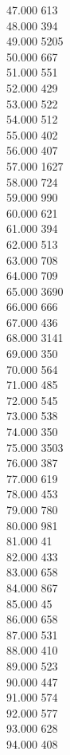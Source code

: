 { 47.000	613 \\
 48.000	394 \\
 49.000	5205 \\
 50.000	667 \\
 51.000	551 \\
 52.000	429 \\
 53.000	522 \\
 54.000	512 \\
 55.000	402 \\
 56.000	407 \\
 57.000	1627 \\
 58.000	724 \\
 59.000	990 \\
 60.000	621 \\
 61.000	394 \\
 62.000	513 \\
 63.000	708 \\
 64.000	709 \\
 65.000	3690 \\
 66.000	666 \\
 67.000	436 \\
 68.000	3141 \\
 69.000	350 \\
 70.000	564 \\
 71.000	485 \\
 72.000	545 \\
 73.000	538 \\
 74.000	350 \\
 75.000	3503 \\
 76.000	387 \\
 77.000	619 \\
 78.000	453 \\
 79.000	780 \\
 80.000	981 \\
 81.000	41 \\
 82.000	433 \\
 83.000	658 \\
 84.000	867 \\
 85.000	45 \\
 86.000	658 \\
 87.000	531 \\
 88.000	410 \\
 89.000	523 \\
 90.000	447 \\
 91.000	574 \\
 92.000	577 \\
 93.000	628 \\
 94.000	408 \\
}
